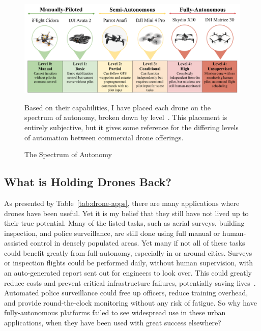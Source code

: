 \begin{figure}[]
\begin{captext}
    \end{captext}
    \\[0.6cm]
    \centering
    \includegraphics[width=1.0\linewidth]{chapter2/FIGS/spectrum.png}
    \begin{captext}
        \small Based on their capabilities, I have placed each drone on the spectrum of autonomy, broken down by level~\cite{Cloudfactory}. This placement is entirely subjective, but it gives some reference for the differing levels of automation between commercial drone offerings.
    \end{captext}
    \caption{The Spectrum of Autonomy~\cite{Cidora,DJIAvata2,ParrotAnafi,DJIMini4,SkydioX10,Matrice30T}}
    \label{fig:spectrum}
\end{figure}

\subsection{What is Holding Drones Back?}
\label{sec:problems}
As presented by Table~\ref{tab:drone-apps}, there are many applications where drones have been useful. Yet it is my belief that they still have not lived up to their true potential. Many of the listed tasks, such as aerial surveys, building inspection, and police surveillance, are still done using full manual or human-assisted control in densely populated areas. Yet many if not all of these tasks could benefit greatly from full-autonomy, especially in or around cities. Surveys or inspection flights could be performed daily, without human supervision, with an auto-generated report sent out for engineers to look over. This could greatly reduce costs and prevent critical infrastructure failures, potentially saving lives~\cite{Dorafshan2018}. Automated police surveillance could free up officers, reduce training overhead, and provide round-the-clock monitoring without any risk of fatigue. So why have fully-autonomous platforms failed to see widespread use in these urban applications, when they have been used with great success elsewhere?

